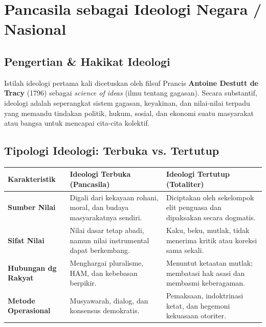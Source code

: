 \documentclass[10pt,a4paper]{article}
\begin{document}
\section{Pancasila sebagai Ideologi Negara / Nasional}

\subsection{Pengertian \& Hakikat Ideologi}
Istilah ideologi pertama kali dicetuskan oleh filsuf Prancis \textbf{Antoine Destutt de Tracy} (1796) sebagai \textit{science of ideas} (ilmu tentang gagasan). Secara substantif, ideologi adalah seperangkat sistem gagasan, keyakinan, dan nilai-nilai terpadu yang memandu tindakan politik, hukum, sosial, dan ekonomi suatu masyarakat atau bangsa untuk mencapai cita-cita kolektif.

\subsection{Tipologi Ideologi: Terbuka vs. Tertutup}
\begin{tabularx}{\linewidth}{lXX}
  \toprule
  \textbf{Karakteristik} & \textbf{Ideologi Terbuka (Pancasila)} & \textbf{Ideologi Tertutup (Totaliter)} \\
  \midrule
  \textbf{Sumber Nilai} & Digali dari kekayaan rohani, moral, dan budaya masyarakatnya sendiri. & Diciptakan oleh sekelompok elit penguasa dan dipaksakan secara dogmatis. \\
  \textbf{Sifat Nilai} & Nilai dasar tetap abadi, namun nilai instrumental dapat berkembang. & Kaku, beku, mutlak, tidak menerima kritik atau koreksi sama sekali. \\
  \textbf{Hubungan dg Rakyat} & Menghargai pluralisme, HAM, dan kebebasan berpikir. & Menuntut ketaatan mutlak; membatasi hak asasi dan membasmi keberagaman. \\
  \textbf{Metode Operasional} & Musyawarah, dialog, dan konsensus demokratis. & Pemaksaan, indoktrinasi ketat, dan hegemoni kekuasaan otoriter. \\
  \bottomrule
\end{tabularx}
\end{document}
